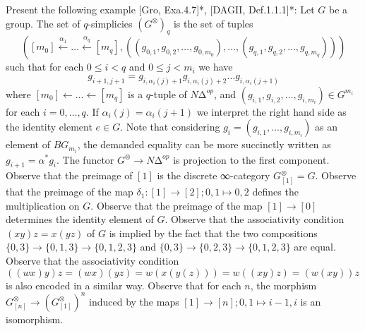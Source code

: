 \documentclass[a4paper]{amsart}
\numberwithin{figure}{section}
\theoremstyle{theorem}
\theoremstyle{definition}
\begin{document}
Present the following example [Gro, Exa.4.7]*, [DAGII, Def.1.1.1]*: Let $G$ be a group. 
The set of $q$-simplicies $(G^\otimes)_q$ is the set of tuples 
%
$$([m_0] {\stackrel{\alpha_1}{\leftarrow}} \dots {\stackrel{\alpha_q}{\leftarrow}} [m_q], ((g_{0,1}, g_{0,2}, \dots, g_{0, m_0}), \dots, (g_{q,1}, g_{q,2}, \dots, g_{q, m_q})))$$ 
%
such that for each $0 ≤ i < q$ and $0 ≤ j < m_i$ we have %
$$g_{i{+}1,j{+}1} = g_{i,\alpha_i(j)+1}g_{i,\alpha_i(j)+2}\dots g_{i,\alpha_i(j{+}1)}$$ %
where $[m_0] {\leftarrow} \dots {\leftarrow} [m_q]$ is a $q$-tuple of $N∆^{op}$, and $(g_{i,1}, g_{i,2}, \dots, g_{i, m_i}) \in G^{m_i}$ for each $i = 0, \dots, q$. If $\alpha_i(j) = \alpha_i(j{+}1)$ we interpret the right hand side as the identity element $e \in G$. Note that considering $g_i = (g_{i,1}, \dots, g_{i, m_i})$ as an element of $BG_{m_i}$, the demanded equality can be more succinctly written as $g_{i+1} = \alpha^*g_i$. %
The functor $G^\otimes \to N∆^{op}$ is projection to the first component. %
Observe that the preimage of $[1]$ is the discrete ∞-category $G^\otimes_{[1]} = G$. %
Observe that the preimage of the map $\delta_1: [1] {→} [2]; 0,1 \mapsto 0,2$ defines the multiplication on $G$. %
Observe that the preimage of the map $[1] → [0]$ determines the identity element of $G$. %
Observe that the associativity condition $(xy)z = x(yz)$ of $G$ is implied by the fact that the two compositions $\{0,3\} → \{0,1,3\} → \{0,1,2,3\}$ and $\{0,3\} → \{0,2,3\} → \{0,1,2,3\}$ are equal. %
Observe that the associativity condition $((wx)y)z = (wx)(yz) = w(x(y(z))) = w((xy)z) = (w(xy))z$ is also encoded in a similar way. %
Observe that for each $n$, the morphism $G^\otimes_{[n]} \to (G^\otimes_{[1]})^n$ induced by the maps $[1] {→} [n]; 0,1 \mapsto i{-}1,i$ is an isomorphism. %


\end{document}
